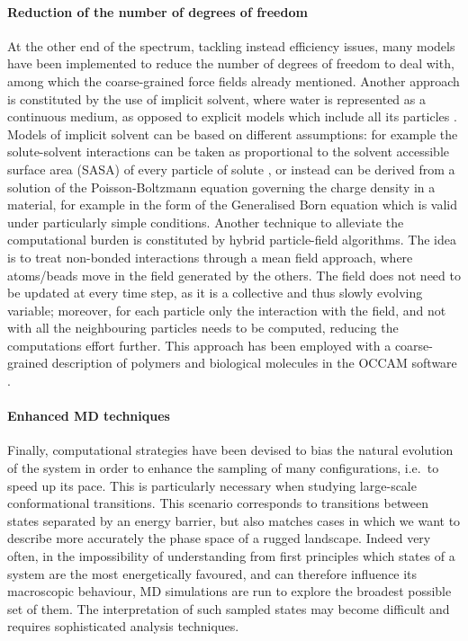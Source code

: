 \paragraph{Reduction of the number of degrees of freedom}
At the other end of the spectrum, tackling instead efficiency issues, many models have been implemented to reduce the number of degrees of freedom to deal with, among which the coarse-grained force fields already mentioned.
%
Another approach is constituted by the use of implicit solvent, where water is represented as a continuous medium, as opposed to explicit models which include all its particles \citep{Kleinjung2014}.
%
Models of implicit solvent can be based on different assumptions: for example the solute-solvent interactions can be taken as proportional to the solvent accessible surface area (SASA) of every particle of solute \citep{Fraternali1996,Kleinjung2003,Kleinjung2012,Fornili2012}, or instead can be derived from a solution of the Poisson-Boltzmann equation governing the charge density in a material, for example in the form of the Generalised Born equation \citep{Zhu2005} which is valid under particularly simple conditions.
%
Another technique to alleviate the computational burden is constituted by hybrid particle-field algorithms. The idea is to treat non-bonded interactions through a mean field approach, where atoms/beads move in the field generated by the others. The field does not need to be updated at every time step, as it is a collective and thus slowly evolving variable; moreover, for each particle only the interaction with the field, and not with all the neighbouring particles needs to be computed, reducing the computations effort further. This approach has been employed with a coarse-grained description of polymers and biological molecules in the OCCAM software \citep{Milano2009}.

\paragraph{Enhanced MD techniques}
Finally, computational strategies have been devised to bias the natural evolution of the system in order to enhance the sampling of many configurations, i.e.\ to speed up its pace.
%
This is particularly necessary when studying large-scale conformational transitions. This scenario corresponds to transitions between states separated by an energy barrier, but also matches cases in which we want to describe more accurately the phase space of a rugged landscape. Indeed very often, in the impossibility of understanding from first principles which states of a system are the most energetically favoured, and can therefore influence its macroscopic behaviour, MD simulations are run to explore the broadest possible set of them. The interpretation of such sampled states may become difficult and requires sophisticated analysis techniques.


